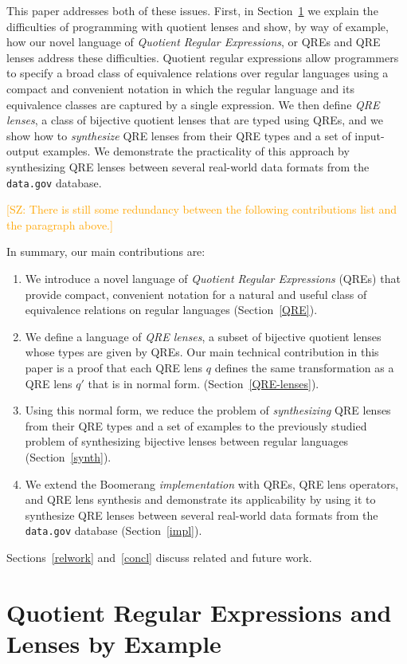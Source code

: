 \documentclass{svproc}
\newcommand{\FINISH}[3]{\ifdraft\textcolor{#1}{[#2: #3]}\fi}
\newcommand{\saz}[1]{\FINISH{orange}{SZ}{#1}}
\begin{document}
This paper addresses both of these issues.  First, in Section~\ref{sec:example} we
explain the difficulties of programming with quotient lenses and show, by way of
example, how our novel language of {\em Quotient Regular Expressions}, or QREs
and QRE lenses address these difficulties.  Quotient regular expressions allow
programmers to specify a broad class of equivalence relations over regular
languages using a compact and convenient notation in which the regular language
and its equivalence classes are captured by a single expression.  We then
define {\em QRE lenses}, a class of bijective quotient lenses that are typed
using QREs, and we show how to {\em synthesize} QRE lenses from their QRE types
and a set of input-output examples.  We demonstrate the practicality of this
approach by synthesizing QRE lenses between several real-world data formats
from the {\tt data.gov} database.

\saz{There is still some redundancy between the following contributions list and
  the paragraph above.}

In summary, our main contributions are:
\begin{enumerate}
\item We introduce a novel language of {\em Quotient Regular Expressions}
(QREs) that provide compact, convenient notation for a natural and useful
class of equivalence relations on regular languages (Section~\ref{QRE}).
\item We define a language of {\em QRE lenses}, a subset of bijective quotient
lenses whose types are given by QREs. Our main technical contribution in this
paper is a proof that each QRE lens $q$ defines the same transformation as a
QRE lens $q'$ that is in normal form. (Section~\ref{QRE-lenses}).
\item Using this normal form, we reduce the problem of {\em synthesizing}
QRE lenses from their QRE types and a set of examples to the previously studied
problem of synthesizing bijective lenses between regular languages 
(Section~\ref{synth}).
\item We extend the Boomerang {\em implementation} with QREs, QRE lens operators,
and QRE lens synthesis and demonstrate its applicability by using it to
synthesize QRE lenses between several real-world data formats from the
{\tt data.gov} database (Section~\ref{impl}).
\end{enumerate}
Sections~\ref{relwork} and~\ref{concl} discuss related and future work.

\section{Quotient Regular Expressions and Lenses by Example}
\label{sec:example}
\end{document}

